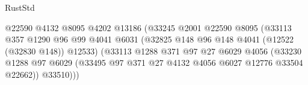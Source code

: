\begin{lexlean}{RustStd}
\begin{coremodule}
                                              @22590
                                              @4132
                                              @8095
                                              @4202
                                              @13186
                                              (@33245
                                                @2001
                                                @22590
                                                @8095
                                                (@33113
                                                  @357
                                                  @1290
                                                  @96
                                                  @99
                                                  @4041
                                                  @6031
                                                  (@32825
                                                    @148
                                                    @96
                                                    @148
                                                    @4041
                                                    (@12522 (@32830 @148))
                                                    @12533)
                                                  (@33113
                                                    @1288
                                                    @371
                                                    @97
                                                    @27
                                                    @6029
                                                    @4056
                                                    (@33230
                                                      @1288
                                                      @97
                                                      @6029
                                                      (@33495
                                                        @97
                                                        @371
                                                        @27
                                                        @4132
                                                        @4056
                                                        @6027
                                                        @12776
                                                        @33504
                                                        @22662))
                                                    @33510)))

\end{coremodule}
\end{lexlean}
